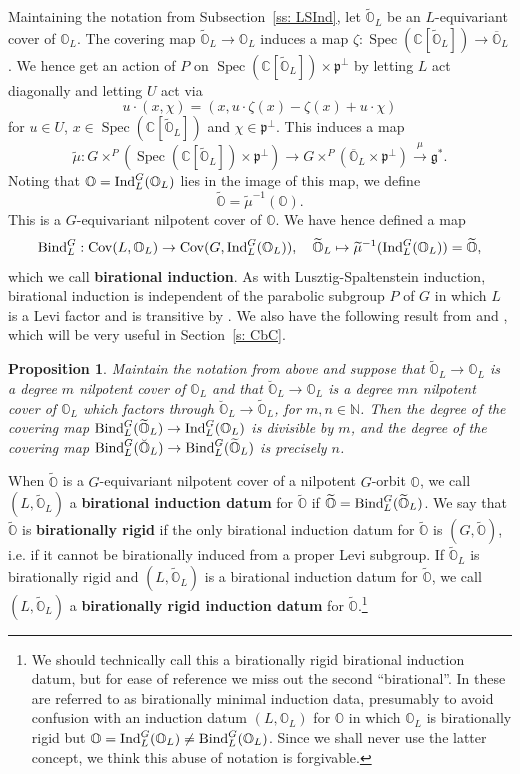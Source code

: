 \documentclass[11pt]{amsart}
\newcommand{\C}{{\mathbb C}}
\renewcommand{\O}{{\mathbb O}}
\newcommand{\N}{{\mathbb N}}
\newcommand{\g}{{\mathfrak g}}
\newcommand{\p}{{\mathfrak p}}
\newcommand{\Spec}{\operatorname{Spec}}
\newcommand{\Cov}{\operatorname{Cov}}
\newcommand{\Ind}{{{\mbox{\rm Ind}}}}
\newcommand{\BInd}{{{\mbox{\rm Bind}}}}
\newcommand{\covO}{\widetilde{\O}}
\newcommand{\breveO}{\breve{\O}}
\newtheorem{prop}[theorem]{Proposition}
\numberwithin{equation}{section}
\begin{document}
	Maintaining the notation from Subsection~\ref{ss: LSInd}, let $\covO_L$ be an $L$-equivariant cover of $\O_L$. The covering map $\covO_L\to\O_L$ induces a map $\zeta:\Spec(\C[\covO_L])\to \overline{\O}_L$. We hence get an action of $P$ on $\Spec(\C[\covO_L])\times \p^\perp$ by letting $L$ act diagonally and letting $U$ act via $$u\cdot(x,\chi)=(x,u\cdot\zeta(x)-\zeta(x) +u\cdot \chi)$$ for $u\in U$, $x\in \Spec(\C[\covO_L])$ and $\chi\in\p^\perp$. This induces a map $$\widetilde{\mu}:G\times^{P} (\Spec(\C[\covO_L])\times \p^\perp)\to G\times^{P} (\overline{\O}_L\times \p^\perp)\xrightarrow{\mu} \g^{*}.$$ Noting that $\O=\Ind_L^G(\O_L)$ lies in the image of this map, we define $$\covO=\widetilde{\mu}^{-1}(\O).$$ This is a $G$-equivariant nilpotent cover of $\O$. We have hence defined a map $$\BInd_L^G:\Cov(L,\O_L)\to \Cov(G,\Ind_L^G(\O_L)),\quad \covO_L\mapsto \widetilde{\mu}^{-1}(\Ind_L^G(\O_L))=\covO,$$ which we call {\bf birational induction}. As with Lusztig-Spaltenstein induction, birational induction is independent of the parabolic subgroup $P$ of $G$ in which $L$ is a Levi factor and is transitive by \cite[Proposition 2.4.1]{LMM}. We also have the following result from \cite[Proposition 2.4.1]{LMM} and \cite[Proposition 2.9]{MMY}, which will be very useful in Section~\ref{s: CbC}.
	
	\begin{prop}\label{prop: deg}
		Maintain the notation from above and suppose that $\covO_L\to \O_L$ is a degree $m$ nilpotent cover of $\O_L$ and that $\breveO_L\to \O_L$ is a degree $mn$ nilpotent cover of $\O_L$ which factors through $\breveO_L\to\covO_L$, for $m,n\in\N$. Then the degree of the covering map $\BInd_L^G(\covO_L)\to \Ind_L^G(\O_L)$ is divisible by $m$, and the degree of the covering map $\BInd_L^G({\breve\O}_L)\to \BInd_L^G(\covO_L)$ is precisely $n$.
	\end{prop}
	
	
	When $\covO$ is a $G$-equivariant nilpotent cover of a nilpotent $G$-orbit $\O$, we call $(L,\covO_L)$ a {\bf birational induction datum} for $\covO$ if $\covO=\BInd_L^G(\covO_L)$. We say that $\covO$ is {\bf birationally rigid} if the only birational induction datum for $\covO$ is $(G,\covO)$, i.e. if it cannot be birationally induced from a proper Levi subgroup. If $\covO_L$ is birationally rigid and $(L,\covO_L)$ is a birational induction datum for $\covO$, we call $(L,\covO_L)$ a {\bf birationally rigid induction datum} for $\covO$.\footnote{We should technically call this a birationally rigid birational induction datum, but for ease of reference we miss out the second ``birational''. In \cite{LoOM} these are referred to as birationally minimal induction data, presumably to avoid confusion with an induction datum $(L,\O_L)$ for $\O$ in which $\O_L$ is birationally rigid but $\O=\Ind_L^G(\O_L)\neq\BInd_L^G(\O_L)$. Since we shall never use the latter concept, we think this abuse of notation is forgivable.}
	
\end{document}
